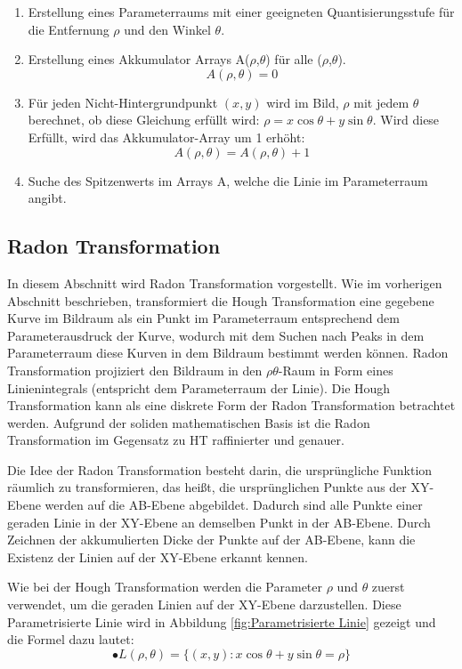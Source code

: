 \begin{enumerate}
\item Erstellung eines Parameterraums mit einer geeigneten Quantisierungsstufe für die Entfernung $ \rho $ und den Winkel $ \theta $.
\item Erstellung eines Akkumulator Arrays A($ \rho $,$ \theta $) für alle ($ \rho $,$ \theta $).
\begin{equation}
A(\rho,\theta) = 0
\end{equation}
\item Für jeden Nicht-Hintergrundpunkt $ (x,y) $ wird im Bild, $ \rho $ mit jedem $ \theta $ berechnet, ob diese Gleichung erfüllt wird: $ \rho = x \cos \theta + y \sin \theta $. Wird diese Erfüllt, wird das Akkumulator-Array um 1 erhöht: 
\begin{equation}
 A(\rho,\theta) = A(\rho,\theta) + 1 
\end{equation}
\item Suche des Spitzenwerts im Arrays A, welche die Linie im Parameterraum angibt.
\end{enumerate}


\subsection{Radon Transformation}
In diesem Abschnitt wird Radon \cite{radon} Transformation vorgestellt. Wie im vorherigen Abschnitt beschrieben, transformiert die Hough Transformation eine gegebene Kurve im Bildraum als ein Punkt im Parameterraum entsprechend dem Parameterausdruck der Kurve, wodurch mit dem Suchen nach Peaks in dem Parameterraum diese Kurven in dem Bildraum bestimmt werden können. Radon Transformation projiziert den Bildraum in den $ \rho \theta $-Raum in Form eines Linienintegrals (entspricht dem Parameterraum der Linie). Die Hough Transformation kann als eine diskrete Form der Radon Transformation betrachtet werden. Aufgrund der soliden mathematischen Basis ist die Radon Transformation im Gegensatz zu HT raffinierter und genauer.

Die Idee der Radon Transformation besteht darin, die ursprüngliche Funktion räumlich zu transformieren, das heißt, die ursprünglichen Punkte aus der XY-Ebene werden auf die AB-Ebene abgebildet. Dadurch sind alle Punkte einer geraden Linie in der XY-Ebene an demselben Punkt in der AB-Ebene. Durch Zeichnen der akkumulierten Dicke der Punkte auf der AB-Ebene, kann die Existenz der Linien auf der XY-Ebene erkannt kennen.

Wie bei der Hough Transformation werden die Parameter $ \rho $ und $ \theta $ zuerst verwendet, um die geraden Linien auf der XY-Ebene darzustellen. Diese Parametrisierte Linie wird in Abbildung \ref{fig:Parametrisierte Linie} gezeigt und die Formel dazu lautet:
\begin{equation}
•  L(\rho,\theta)=\lbrace(x,y):x\cos{\theta} + y\sin{\theta} = \rho\rbrace
\end{equation} 

